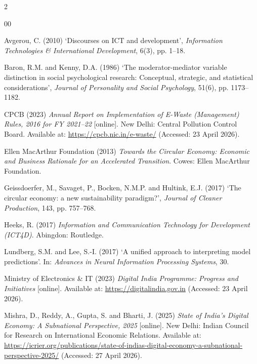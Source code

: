 \documentclass[10pt,a4paper]{article}
\begin{document}
\clearpage
\setlength{\bibsep}{0pt}
\begingroup
\small
\begin{spacing}{2}
\begin{thebibliography}{00}

Avgerou, C. (2010) `Discourses on ICT and development', \textit{Information Technologies \& International Development}, 6(3), pp. 1--18.

Baron, R.M. and Kenny, D.A. (1986) `The moderator-mediator variable distinction in social psychological research: Conceptual, strategic, and statistical considerations', \textit{Journal of Personality and Social Psychology}, 51(6), pp. 1173--1182.

CPCB (2023) \textit{Annual Report on Implementation of E-Waste (Management) Rules, 2016 for FY 2021--22} [online]. New Delhi: Central Pollution Control Board. Available at: \url{https://cpcb.nic.in/e-waste/} (Accessed: 23 April 2026).

Ellen MacArthur Foundation (2013) \textit{Towards the Circular Economy: Economic and Business Rationale for an Accelerated Transition}. Cowes: Ellen MacArthur Foundation.

Geissdoerfer, M., Savaget, P., Bocken, N.M.P. and Hultink, E.J. (2017) `The circular economy: a new sustainability paradigm?', \textit{Journal of Cleaner Production}, 143, pp. 757--768.

Heeks, R. (2017) \textit{Information and Communication Technology for Development (ICT4D)}. Abingdon: Routledge.

Lundberg, S.M. and Lee, S.-I. (2017) `A unified approach to interpreting model predictions'. In: \textit{Advances in Neural Information Processing Systems}, 30.

Ministry of Electronics \& IT (2023) \textit{Digital India Programme: Progress and Initiatives} [online]. Available at: \url{https://digitalindia.gov.in} (Accessed: 23 April 2026).

Mishra, D., Reddy, A., Gupta, S. and Bharti, J. (2025) \textit{State of India's Digital Economy: A Subnational Perspective, 2025} [online]. New Delhi: Indian Council for Research on International Economic Relations. Available at: \url{https://icrier.org/publications/state-of-indias-digital-economy-a-subnational-perspective-2025/} (Accessed: 27 April 2026).


\end{thebibliography}
\end{spacing}
\end{document}
